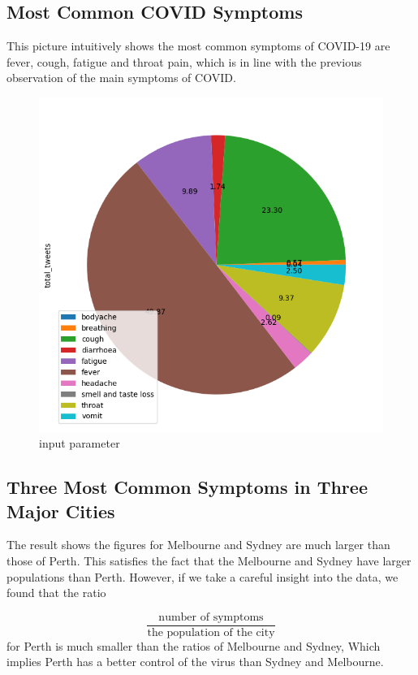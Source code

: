 \subsection{Most Common COVID Symptoms}

This picture intuitively shows the most common symptoms of COVID-19 are fever, cough, fatigue and throat pain, which is in line with the previous observation of the main symptoms of COVID.
\begin{figure}[H]
\centering
\includegraphics[scale=0.4]{city_analytics/georesults/symptoms_total_sa4.png}
\caption{input parameter}
\label{fig:input parameter}
\end{figure}

\subsection{Three Most Common Symptoms in Three Major Cities}
The result shows the figures for Melbourne and Sydney are much larger than those of Perth. This satisfies the fact that the Melbourne and Sydney have larger populations than Perth. However, if we take a careful insight into the data, we found that the ratio 

\[\frac{\text{number of symptoms}}{\text{the population of the city}}\] for Perth is much smaller than the ratios of Melbourne and Sydney, Which implies Perth has a better control of the virus than Sydney and Melbourne. 


